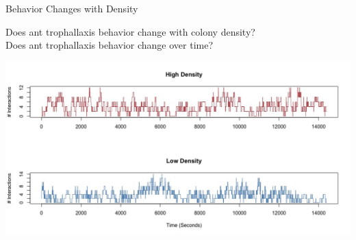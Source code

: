 \documentclass[10pt]{beamer}
\begin{document}
\begin{frame}{Behavior Changes with Density}

Does ant trophallaxis behavior change with colony density? \\
Does ant trophallaxis behavior change over time?


   
     \includegraphics[width=\textwidth]{Ndata.jpeg}



\end{frame}
\end{document}

